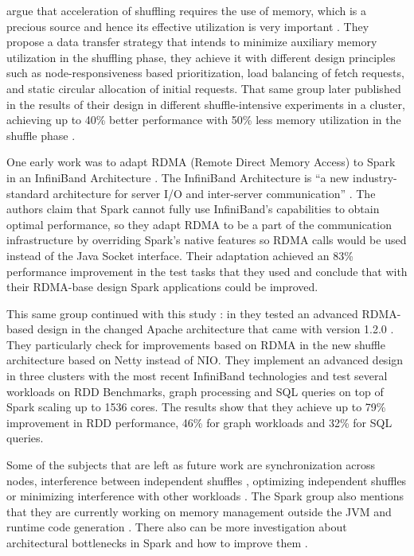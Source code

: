 \documentclass{article}
\begin{document}
\citeauthor{Nicolae2016} argue that acceleration of shuffling requires the use of memory, which is a precious source and hence its effective utilization is very important \cite{Nicolae2016}. They propose a data transfer strategy that intends to minimize auxiliary memory utilization in the shuffling phase, they achieve it with different design principles such as node-responsiveness based prioritization, load balancing of fetch requests, and static circular allocation of initial requests. That same group later published in \citeyear{nicolae2017leveraging} the results of their design in different shuffle-intensive experiments in a cluster, achieving up to 40\% better performance with 50\% less memory utilization in the shuffle phase \cite{nicolae2017leveraging}.

One early work was to adapt RDMA (Remote Direct Memory Access) to Spark in an InfiniBand Architecture \cite{Lu2014}. The InfiniBand Architecture is ``a new industry-standard architecture for server I/O and inter-server communication'' \cite{pfister2001introduction}. The authors claim that Spark cannot fully use InfiniBand's capabilities to obtain optimal performance, so they adapt RDMA to be a part of the communication infrastructure by overriding Spark's native features so RDMA calls would be used instead of the Java Socket interface. Their adaptation achieved an 83\% performance improvement in the test tasks that they used and conclude that with their RDMA-base design Spark applications could be improved.

This same group continued with this study \cite{Lu2016}: in \citeyear{Lu2016} they tested an advanced RDMA-based design in the changed Apache architecture that came with version 1.2.0 \cite{Armbrust2015}. They particularly check for improvements based on RDMA in the new shuffle architecture based on Netty instead of NIO. They implement an advanced design in three clusters with the most recent InfiniBand technologies and test several workloads on RDD Benchmarks, graph processing and SQL queries on top of Spark scaling up to 1536 cores. The results show that they achieve up to 79\% improvement in RDD performance, 46\% for graph workloads and 32\% for SQL queries. 

Some of the subjects that are left as future work are synchronization across nodes, interference between independent shuffles \cite{nicolae2017leveraging}, optimizing independent shuffles or minimizing interference with other workloads \cite{Nicolae2016}. The Spark group also mentions that they are currently working on memory management outside the JVM and runtime code generation \cite{Armbrust2015}. There also can be more investigation about architectural bottlenecks in Spark and how to improve them \cite{Lu2016}.
\end{document}
